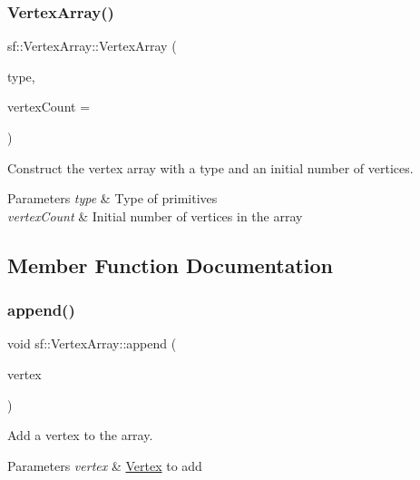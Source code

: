 \subsubsection{\texorpdfstring{Vertex\+Array()}{VertexArray()}\hspace{0.1cm}{\footnotesize\ttfamily [2/2]}}
{\footnotesize\ttfamily sf\+::\+Vertex\+Array\+::\+Vertex\+Array (\begin{DoxyParamCaption}\item[{\hyperlink{group__graphics_ga5ee56ac1339984909610713096283b1b}{Primitive\+Type}}]{type,  }\item[{std\+::size\+\_\+t}]{vertex\+Count = {} }\end{DoxyParamCaption})\hspace{0.3cm}{\ttfamily [explicit]}}



Construct the vertex array with a type and an initial number of vertices. 


\begin{DoxyParams}{Parameters}
{\em type} & Type of primitives \\
\hline
{\em vertex\+Count} & Initial number of vertices in the array \\
\hline
\end{DoxyParams}


\subsection{Member Function Documentation}
\mbox{\label{classsf_1_1_vertex_array_a80c8f6865e53bd21fc6cb10fffa10035}} 
\subsubsection{\texorpdfstring{append()}{append()}}
{\footnotesize\ttfamily void sf\+::\+Vertex\+Array\+::append (\begin{DoxyParamCaption}\item[{const \hyperlink{classsf_1_1_vertex}{Vertex} \&}]{vertex }\end{DoxyParamCaption})}



Add a vertex to the array. 


\begin{DoxyParams}{Parameters}
{\em vertex} & \hyperlink{classsf_1_1_vertex}{Vertex} to add \\
\hline
\end{DoxyParams}
\mbox{\label{classsf_1_1_vertex_array_a3654c424aca1f9e468f369bc777c839c}} 
